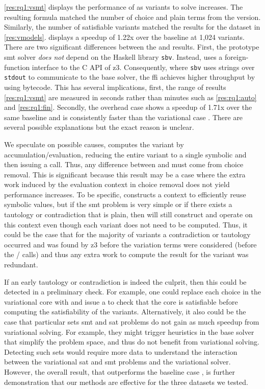 \autoref{res:rq1:vsmt} displays the performance of \vsmt{} as variants to solve
increases. The resulting \evpl{} formula matched the number of choice and plain
terms from the \vsat{} version. Similarly, the number of satisfiable variants
matched the results for the \fin{} dataset in \autoref{res:vmodels}. \vsmt{}
displays a speedup of 1.22x over the baseline \vTop{} at 1,024 variants. There
are two significant differences between the \vsmt{} and \vsat{} results. First,
the prototype \ac{smt} solver \emph{does not} depend on the Haskell library
\texttt{sbv}. Instead, \vsmt{} uses a foreign-function interface to the C API of
z3. Consequently, where \texttt{sbv} uses strings over \texttt{stdout} to
communicate to the base solver, the ffi \vsmt{} achieves higher throughput by
using bytecode. This has several implications, first, the range of results
\autoref{res:rq1:vsmt} are measured in seconds rather than minutes such as
\autoref{res:rq1:auto} and \autoref{res:rq1:fin}. Secondly, the overhead case
\pTov{} shows a speedup of 1.71x over the same baseline and is consistently
faster than the variational case \vTov{}. There are several possible
explanations but the exact reason is unclear.

We speculate on possible causes, \pTov{} computes the variant by
accumulation/evaluation, reducing the entire variant to a single symbolic and
then issuing a  call. Thus, any difference between \vTov{} and
\pTov{} must come from choice removal.
%
This is significant because this result may be a case where the extra work
induced by the evaluation context in choice removal does not yield performance
increases. To be specific, \vTov{} constructs a context to efficiently reuse
symbolic values, but if the \ac{smt} problem is very simple or if there exists a
tautology or contradiction that is plain, then \vTov{} will still construct and
operate on this context even though each variant does not need to be computed.
Thus, it could be the case that for the majority of variants a contradiction or
tautology occurred and was found by z3 before the variation terms were
considered (before the / calls) and thus any extra work to
compute the result for the variant was redundant.

If an early tautology or contradiction is indeed the culprit, then this could be
detected in a preliminary check. For example, one could replace each choice in
the variational core with \tru{} and issue a  to check that the
core is satisfiable before computing the satisfiability of the variants.
Alternatively, it also could be the case that particular sets \ac{smt} and
\ac{sat} problems do not gain as much speedup from variational solving. For
example, they might trigger heuristics in the base solver that simplify the
problem space, and thus do not benefit from variational solving. Detecting such
sets would require more data to understand the interaction between the
variational \ac{sat} and \ac{smt} problems and the variational solver. However,
the overall result, that \vTov{} outperforms the baseline case \vTop{}, is
further demonstration that our methods are effective for the three datasets we
tested.

